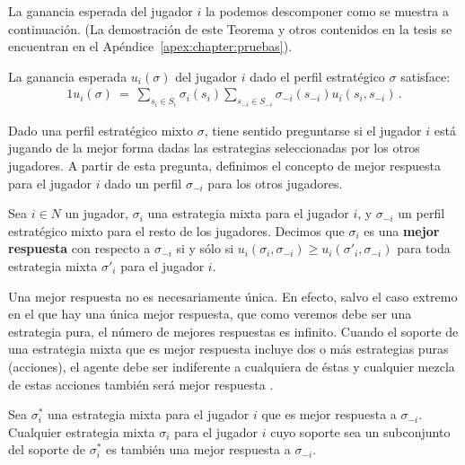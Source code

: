 La ganancia esperada del jugador $i$ la podemos descomponer como se muestra a continuación. (La demostración de este Teorema y otros contenidos en la tesis se encuentran en el Apéndice~\ref{apex:chapter:pruebas}).

\begin{theorem}
\label{theo:ganancia-esperada}
La ganancia esperada $u_i(\sigma)$ del jugador $i$ dado el perfil estratégico $\sigma$ satisface:
\begin{alignat}{1}
u_i(\sigma)\ =\ \sum_{s_i\in S_i} \sigma_i(s_i) \sum_{s_{-i}\in S_{-i}} \sigma_{-i}(s_{-i}) u_i(s_i,s_{-i}) \,.
\end{alignat}
\end{theorem}

Dado una perfil estratégico mixto $\sigma$, tiene sentido preguntarse si el jugador $i$ está jugando de la mejor forma dadas las estrategias seleccionadas por los otros jugadores. A partir de esta pregunta, definimos el concepto de mejor respuesta para el jugador $i$ dado un perfil $\sigma_{-i}$ para los otros jugadores.

\begin{definition}
\label{def:mejor-respuesta}
Sea $i\in N$ un jugador, $\sigma_i$ una estrategia mixta para el jugador $i$, y $\sigma_{-i}$ un perfil estratégico mixto para el resto de los jugadores. Decimos que $\sigma_i$ es una \textbf{mejor respuesta} con respecto a $\sigma_{-i}$ si y s\'olo si
$u_i(\sigma_i,\sigma_{-i}) \geq u_i(\sigma'_i,\sigma_{-i})$ para toda estrategia mixta $\sigma'_i$ para el jugador $i$.
\end{definition}

Una mejor respuesta no es necesariamente única. En efecto, salvo el caso extremo en el que hay una única mejor respuesta, que como veremos debe ser una estrategia pura, el número de mejores respuestas es infinito. Cuando el soporte de una estrategia mixta que es mejor respuesta incluye dos o más estrategias puras (acciones), el agente debe ser indiferente a cualquiera de éstas y cualquier mezcla de estas  acciones también será mejor respuesta \cite{bib:tutorial-existence-nash}.

\begin{theorem}
\label{theo:mejor-respuesta}
Sea $\sigma^*_i$ una estrategia mixta para el jugador $i$ que es mejor respuesta a $\sigma_{-i}$. Cualquier estrategia mixta $\sigma_i$ para el jugador $i$ cuyo soporte sea un subconjunto del soporte de $\sigma^*_i$ es también una mejor respuesta a $\sigma_{-i}$.
\end{theorem}

